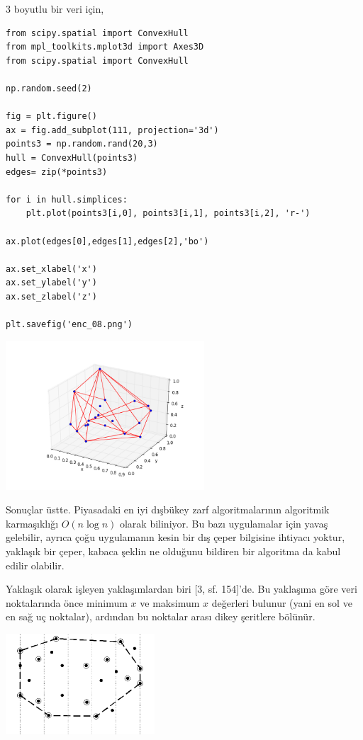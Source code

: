 \documentclass[12pt,fleqn]{article}\usepackage{../../common}
\begin{document}
3 boyutlu bir veri için,

\begin{verbatim}
from scipy.spatial import ConvexHull
from mpl_toolkits.mplot3d import Axes3D
from scipy.spatial import ConvexHull

np.random.seed(2)

fig = plt.figure()
ax = fig.add_subplot(111, projection='3d')
points3 = np.random.rand(20,3)
hull = ConvexHull(points3)
edges= zip(*points3)

for i in hull.simplices:
    plt.plot(points3[i,0], points3[i,1], points3[i,2], 'r-')

ax.plot(edges[0],edges[1],edges[2],'bo')

ax.set_xlabel('x')
ax.set_ylabel('y')
ax.set_zlabel('z')

plt.savefig('enc_08.png')
\end{verbatim}

\includegraphics[width=20em]{enc_08.png}

Sonuçlar üstte. Piyasadaki en iyi dışbükey zarf algoritmalarının algoritmik
karmaşıklığı $O(n \log n)$ olarak biliniyor. Bu bazı uygulamalar için yavaş
gelebilir, ayrıca çoğu uygulamanın kesin bir dış çeper bilgisine
ihtiyacı yoktur, yaklaşık bir çeper, kabaca şeklin ne olduğunu bildiren bir
algoritma da kabul edilir olabilir.

Yaklaşık olarak işleyen yaklaşımlardan biri [3, sf. 154]'de. Bu yaklaşıma
göre veri noktalarında önce minimum $x$ ve maksimum $x$ değerleri bulunur
(yani en sol ve en sağ uç noktalar), ardından bu noktalar arası dikey
şeritlere bölünür.

\includegraphics[width=15em]{enc_03.png}
\end{document}
